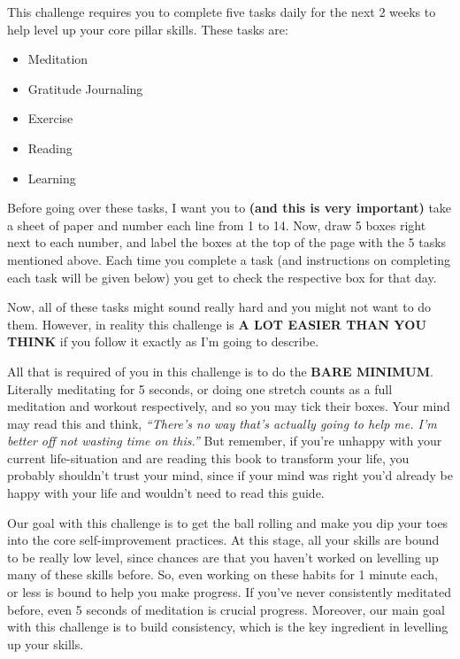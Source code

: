 \documentclass[
]{book}
\providecommand{\tightlist}{%
  \setlength{\itemsep}{0pt}\setlength{\parskip}{0pt}}
\begin{document}
This challenge requires you to complete five tasks daily for the next 2 weeks to help level up your core pillar skills. These tasks are:

\begin{itemize}
\tightlist
\item
  Meditation
\item
  Gratitude Journaling
\item
  Exercise
\item
  Reading
\item
  Learning
\end{itemize}

Before going over these tasks, I want you to \textbf{(and this is very important)} take a sheet of paper and number each line from 1 to 14. Now, draw 5 boxes right next to each number, and label the boxes at the top of the page with the 5 tasks mentioned above. Each time you complete a task (and instructions on completing each task will be given below) you get to check the respective box for that day.

Now, all of these tasks might sound really hard and you might not want to do them. However, in reality this challenge is \textbf{A LOT EASIER THAN YOU THINK} if you follow it exactly as I'm going to describe.

All that is required of you in this challenge is to do the \textbf{BARE MINIMUM}. Literally meditating for 5 seconds, or doing one stretch counts as a full meditation and workout respectively, and so you may tick their boxes. Your mind may read this and think, \emph{``There's no way that's actually going to help me. I'm better off not wasting time on this.''} But remember, if you're unhappy with your current life-situation and are reading this book to transform your life, you probably shouldn't trust your mind, since if your mind was right you'd already be happy with your life and wouldn't need to read this guide.

Our goal with this challenge is to get the ball rolling and make you dip your toes into the core self-improvement practices. At this stage, all your skills are bound to be really low level, since chances are that you haven't worked on levelling up many of these skills before. So, even working on these habits for 1 minute each, or less is bound to help you make progress. If you've never consistently meditated before, even 5 seconds of meditation is crucial progress. Moreover, our main goal with this challenge is to build consistency, which is the key ingredient in levelling up your skills.
\end{document}
